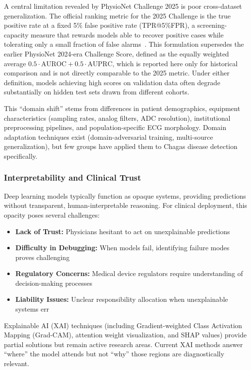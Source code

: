 A central limitation revealed by PhysioNet Challenge 2025 is poor cross-dataset generalization. The official ranking metric for the 2025 Challenge is the true positive rate at a fixed 5\% false positive rate (TPR@5\%FPR), a screening-capacity measure that rewards models able to recover positive cases while tolerating only a small fraction of false alarms~\cite{reyna2024detection}. This formulation supersedes the earlier PhysioNet 2024-era Challenge Score, defined as the equally weighted average $0.5\cdot\text{AUROC}+0.5\cdot\text{AUPRC}$, which is reported here only for historical comparison and is not directly comparable to the 2025 metric. Under either definition, models achieving high scores on validation data often degrade substantially on hidden test sets drawn from different cohorts.

This ``domain shift'' stems from differences in patient demographics, equipment characteristics (sampling rates, analog filters, ADC resolution), institutional preprocessing pipelines, and population-specific ECG morphology. Domain adaptation techniques exist (domain-adversarial training, multi-source generalization), but few groups have applied them to Chagas disease detection specifically.

\subsubsection{Interpretability and Clinical Trust}

Deep learning models typically function as opaque systems, providing predictions without transparent, human-interpretable reasoning. For clinical deployment, this opacity poses several challenges:

\begin{itemize}
    \item \textbf{Lack of Trust:} Physicians hesitant to act on unexplainable predictions
    \item \textbf{Difficulty in Debugging:} When models fail, identifying failure modes proves challenging
    \item \textbf{Regulatory Concerns:} Medical device regulators require understanding of decision-making processes
    \item \textbf{Liability Issues:} Unclear responsibility allocation when unexplainable systems err
\end{itemize}

Explainable AI (XAI) techniques (including Gradient-weighted Class Activation Mapping (Grad-CAM), attention weight visualization, and SHAP values) provide partial solutions but remain active research areas. Current XAI methods answer ``where'' the model attends but not ``why'' those regions are diagnostically relevant.

